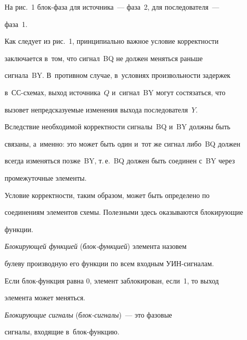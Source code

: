   


   На рис.~1 блок-фаза для источника~--- фаза~2, для последователя~--- 


фаза~1.


   


   Как следует из рис.~1, принципиально важное условие корректности 


заключается в~том, что сигнал~BQ не должен меняться раньше 


сигнала~BY. В~противном случае, в~условиях произвольности задержек 


в~СС-схе\-мах, выход источника~$Q$ и~сигнал~BY могут состязаться, что 


вызовет непредсказуемые изменения выхода последователя~$Y$.


   


   Вследствие необходимой корректности сигналы~BQ и~BY должны быть 


связаны, а~именно: это может быть один и~тот же сигнал либо~BQ должен 


всегда изменяться позже~BY, т.\,е.\ BQ должен быть соединен с~BY через 


промежуточные элементы.


   


   Условие корректности, таким образом, может быть определено по 


соединениям элементов схемы. Полезными здесь оказываются блокирующие 


функции.


   


   \textit{Блокирующей функцией} (\textit{блок-функ\-ци\-ей}) элемента назовем 


булеву производную его функции по всем входным УИН-сигналам.


   


   Если блок-функция равна 0, элемент заблокирован, если~1, то выход 


элемента может меняться.


   


   \textit{Блокирующие сигналы} (\textit{блок-сигналы})~--- это фазовые 


сигналы, входящие в~блок-функцию.


   


